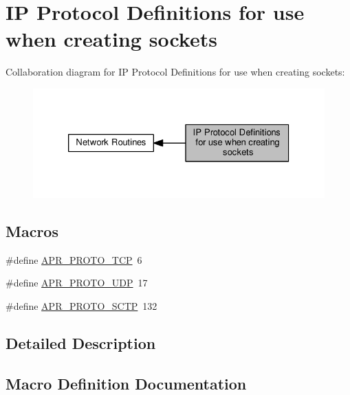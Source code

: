 \hypertarget{group__IP__Proto}{}\section{IP Protocol Definitions for use when creating sockets}
\label{group__IP__Proto}
Collaboration diagram for IP Protocol Definitions for use when creating sockets\+:
\nopagebreak
\begin{figure}[H]
\begin{center}
\leavevmode
\includegraphics[width=326pt]{group__IP__Proto}
\end{center}
\end{figure}
\subsection*{Macros}
\begin{DoxyCompactItemize}
\item 
\#define \hyperlink{group__IP__Proto_gad231c935f9f9746ca43b46cdcf80338e}{A\+P\+R\+\_\+\+P\+R\+O\+T\+O\+\_\+\+T\+CP}~6
\item 
\#define \hyperlink{group__IP__Proto_ga05acc4775ee3f3a637f97c904b8ebd7d}{A\+P\+R\+\_\+\+P\+R\+O\+T\+O\+\_\+\+U\+DP}~17
\item 
\#define \hyperlink{group__IP__Proto_ga89b4fd2811d13e945e937f890b750727}{A\+P\+R\+\_\+\+P\+R\+O\+T\+O\+\_\+\+S\+C\+TP}~132
\end{DoxyCompactItemize}


\subsection{Detailed Description}


\subsection{Macro Definition Documentation}
